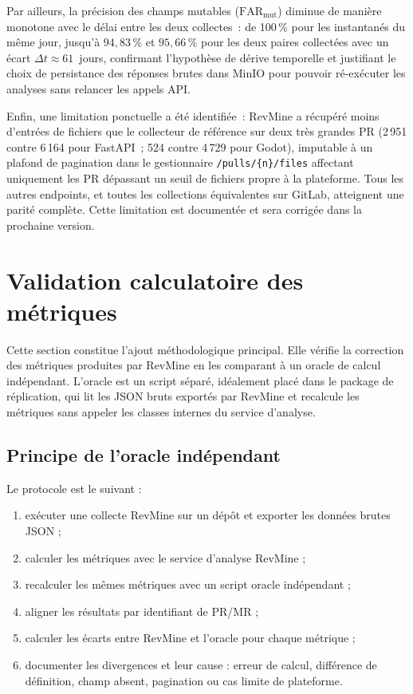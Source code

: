 Par ailleurs, la précision des champs mutables ($\mathrm{FAR}_{\mathrm{mut}}$) diminue de
manière monotone avec le délai entre les deux collectes~: de 100\,\% pour les instantanés du
même jour, jusqu'à $94{,}83\,\%$ et $95{,}66\,\%$ pour les deux paires collectées avec un
écart $\Delta t \approx 61$~jours, confirmant l'hypothèse de dérive temporelle et justifiant le
choix de persistance des réponses brutes dans MinIO pour pouvoir ré-exécuter les analyses sans
relancer les appels API.

Enfin, une limitation ponctuelle a été identifiée~: RevMine a récupéré moins d'entrées de
fichiers que le collecteur de référence sur deux très grandes PR (2\,951 contre 6\,164 pour
FastAPI~; 524 contre 4\,729 pour Godot), imputable à un plafond de pagination dans le gestionnaire
\texttt{/pulls/\{n\}/files} affectant uniquement les PR dépassant un seuil de fichiers propre
à la plateforme. Tous les autres endpoints, et toutes les collections équivalentes sur GitLab,
atteignent une parité complète. Cette limitation est documentée et sera corrigée dans la prochaine
version.


\section{Validation calculatoire des métriques}
\label{sec:validation-calculatoire-metriques}

Cette section constitue l'ajout méthodologique principal. Elle vérifie la correction des métriques produites par RevMine en les comparant à un oracle de calcul indépendant. L'oracle est un script séparé, idéalement placé dans le package de réplication, qui lit les JSON bruts exportés par RevMine et recalcule les métriques sans appeler les classes internes du service d'analyse.

\subsection{Principe de l'oracle indépendant}
\label{subsec:oracle-independant}

Le protocole est le suivant :

\begin{enumerate}
    \item exécuter une collecte RevMine sur un dépôt et exporter les données brutes JSON ;
    \item calculer les métriques avec le service d'analyse RevMine ;
    \item recalculer les mêmes métriques avec un script oracle indépendant ;
    \item aligner les résultats par identifiant de PR/MR ;
    \item calculer les écarts entre RevMine et l'oracle pour chaque métrique ;
    \item documenter les divergences et leur cause : erreur de calcul, différence de définition, champ absent, pagination ou cas limite de plateforme.
\end{enumerate}

